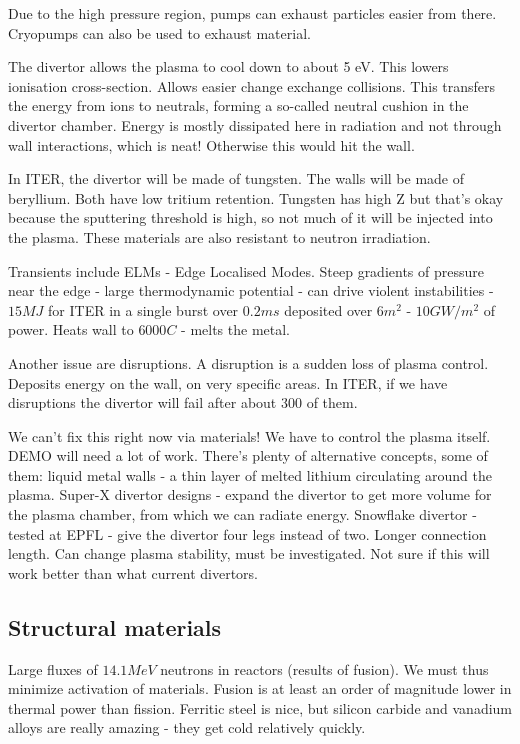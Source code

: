 \documentclass[PlasmaNotes.tex]{subfiles}
\begin{document}
Due to the high pressure region, pumps can exhaust particles easier from there. Cryopumps can also be used to exhaust material.


The divertor allows the plasma to cool down to about 5 eV. This lowers ionisation cross-section. Allows easier change exchange collisions. This transfers the energy from ions to neutrals, forming a so-called neutral cushion in the divertor chamber. Energy is mostly dissipated here in radiation and not through wall interactions, which is neat! Otherwise this would hit the wall.

In ITER, the divertor will be made of tungsten. The walls will be made of beryllium. Both have low tritium retention. Tungsten has high Z but that's okay because the sputtering threshold is high, so not much of it will be injected into the plasma. These materials are also resistant to neutron irradiation.


Transients include ELMs - Edge Localised Modes. Steep gradients of pressure near the edge - large thermodynamic potential - can drive violent instabilities - $15MJ$ for ITER in a single burst over $0.2ms$ deposited over $6m^2$ - $10GW/m^2$ of power. Heats wall to $6000 C$ - melts the metal.

Another issue are disruptions. A disruption is a sudden loss of plasma control. Deposits energy on the wall, on very specific areas. In ITER, if we have disruptions the divertor will fail after about 300 of them.

We can't fix this right now via materials! We have to control the plasma itself. DEMO will need a lot of work. There's plenty of alternative concepts, some of them: liquid metal walls - a thin layer of melted lithium circulating around the plasma. Super-X divertor designs - expand the divertor to get more volume for the plasma chamber, from which we can radiate energy. Snowflake divertor - tested at EPFL - give the divertor four legs instead of two. Longer connection length. Can change plasma stability, must be investigated. Not sure if this will work better than what current divertors.

\subsection{Structural materials}

Large fluxes of $14.1 MeV$ neutrons in reactors (results of fusion). We must thus minimize activation of materials. Fusion is at least an order of magnitude lower in thermal power than fission. Ferritic steel is nice, but silicon carbide and vanadium alloys are really amazing - they get cold relatively quickly.
\end{document}
